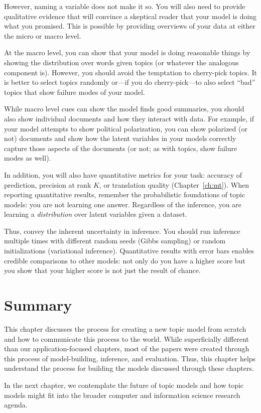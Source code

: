 However, naming a variable does not make it so.  You will also
need to provide qualitative evidence that will convince a skeptical
reader that your model is doing what you promised.  This is possible
by providing overviews of your data at either the micro or macro
level.

At the macro level, you can show that your model is doing reasonable
things by showing the distribution over words given topics (or
whatever the analogous component is).  However, you should avoid the
temptation to cherry-pick topics.  It is better to select topics
randomly or---if you do cherry-pick---to also select ``bad'' topics
that show failure modes of your model.

While macro level cues can show the model finds good summaries, you
should also show individual documents and how they interact with
data.  For example, if your model attempts to show political
polarization, you can show polarized (or not) documents and show how
the latent variables in your models correctly capture those aspects of
the documents (or not; as with topics, show failure
modes as well).

In addition, you will also have quantitative metrics for your task:
accuracy of prediction, precision at rank $K$, or
translation quality (Chapter~\ref{ch:mt}).  When reporting quantitative
results, remember the probabilistic foundations of
topic models: you are not learning one answer.  Regardless of the
inference, you are learning a \emph{distribution} over latent
variables given a dataset.

Thus, convey the inherent uncertainty in inference.
You should run inference multiple times with different random seeds
(Gibbs sampling) or random initializations (variational inference).
Quantitative results with error bars enables
credible comparisons to other models: not only do you have a higher
score but you show that your higher score is not just the result of
chance.

\section{Summary}

This chapter discusses the process for creating a new topic
model from scratch and how to communicate this process to the world.
While superficially different than our application-focused chapters,
most of the papers were created through this process of
model-building, inference, and evaluation.  Thus, this chapter helps
understand the process for building the models discussed
through these chapters.

In the next chapter, we contemplate the future of topic models and how
topic models might fit into the broader computer and information
science research agenda.
